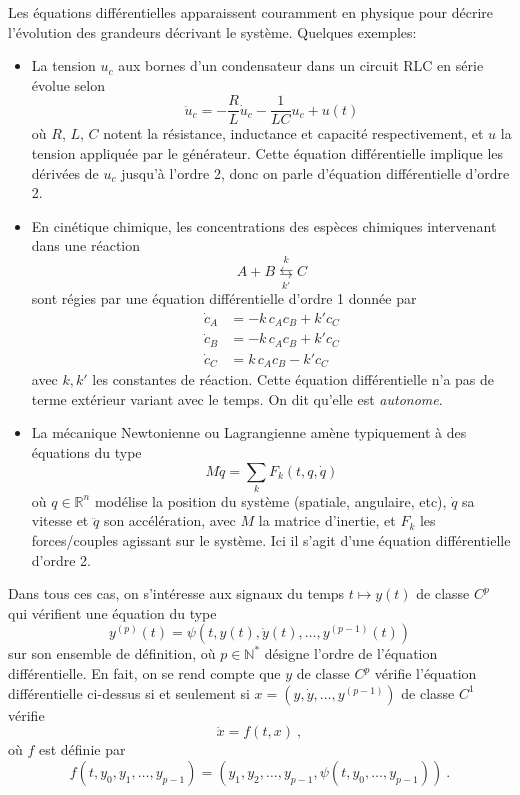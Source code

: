 Les équations différentielles apparaissent couramment en physique pour
décrire l'évolution des grandeurs décrivant le système. Quelques exemples:
\begin{itemize}
\tightlist
\item
  La tension \(u_c\) aux bornes d'un condensateur dans un circuit RLC en
  série évolue selon \[
  \ddot{u}_c = -\frac{R}{L} \dot{u}_c - \frac{1}{LC} u_c + u(t)
  \] où \(R\), \(L\), \(C\) notent la résistance, inductance et capacité
  respectivement, et \(u\) la tension appliquée par le générateur. Cette
  équation différentielle implique les dérivées de \(u_c\) jusqu'à
  l'ordre 2, donc on parle d'équation différentielle d'ordre 2.
\item
  En cinétique chimique, les concentrations des espèces chimiques
  intervenant dans une réaction \[
  A+ B \overset{k}{\underset{k'}{\leftrightarrows}}  C 
  \] sont régies par une équation différentielle d'ordre 1 donnée par
  \begin{align*}
  \dot{c}_A &= -k \, c_Ac_B + k'c_C \\
  \dot{c}_B &= -k \, c_Ac_B + k'c_C\\
  \dot{c}_C &= k \, c_Ac_B - k'c_C
  \end{align*} avec \(k,k'\) les constantes de réaction. Cette équation
  différentielle n'a pas de terme extérieur variant avec le temps. On
  dit qu'elle est \emph{autonome}.
\item
  La mécanique Newtonienne ou Lagrangienne amène typiquement à des
  équations du type \[
  M \ddot{q} = \sum_k F_k(t,q,\dot{q})
  \] où \(q\in \mathbb{R}^n\) modélise la position du système (spatiale,
  angulaire, etc), \(\dot{q}\) sa vitesse et \(\ddot{q}\) son
  accélération, avec \(M\) la matrice d'inertie, et \(F_k\) les
  forces/couples agissant sur le système. Ici il s'agit d'une équation
  différentielle d'ordre 2.
\end{itemize}

Dans tous ces cas, on s'intéresse aux signaux du temps \(t\mapsto y(t)\)
de classe \(C^p\) qui vérifient une équation du type \[
y^{(p)}(t) = \psi\left(t,y(t),\dot{y}(t),\ldots, y^{(p-1)}(t)\right)
\] sur son ensemble de définition, où \(p\in \mathbb{N}^*\) désigne
l'ordre de l'équation différentielle. En fait, on se rend compte que
\(y\) de classe \(C^p\) vérifie l'équation différentielle ci-dessus si
et seulement si \(x=(y,\dot{y},\ldots,y^{(p-1)})\) de classe \(C^1\)
vérifie \[
\dot{x} = f(t,x) \ , 
\] où \(f\) est définie par \[
f(t,y_0,y_1,\ldots,y_{p-1}) = (y_1,y_2,\ldots,y_{p-1},\psi(t,y_0,\ldots,y_{p-1})) \ .
\]

